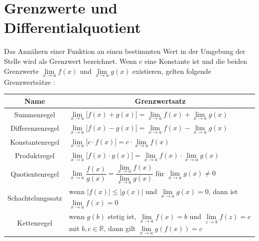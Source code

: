 \documentclass[11pt, a4paper]{report}
\begin{document}
\section{Grenzwerte und Differentialquotient}
Das Annähern einer Funktion an einen bestimmten Wert in der Umgebung der Stelle wird als Grenzwert bezeichnet. Wenn c eine Konstante ist und die beiden Grenzwerte $\lim\limits_{x \to a}{f(x)}$ und $\lim\limits_{x \to a}{g(x)}$ existieren, gelten folgende Grenzwertsätze \cite[Seite 141 ff.]{Stewart.2015}:
\begin{center}
\begin{tabular}[h]{|c|p{9cm}|}
\hline
\multicolumn{1}{|c}{Name} & \multicolumn{1}{|c|}{Grenzwertsatz}\\ \hline %
	Summenregel & $\lim\limits_{x \to a}{\lbrack f(x)+g(x)\rbrack} = \lim\limits_{x \to a}{f(x)}+\lim\limits_{x \to a}{g(x)}$\\ \hline
	Differenzenregel & $\lim\limits_{x \to a}{\lbrack f(x)-g(x)\rbrack} = \lim\limits_{x \to a}{f(x)}-\lim\limits_{x \to a}{g(x)}$\\ \hline
	Konstantenregel & $\lim\limits_{x \to a}{\lbrack c \cdot f(x) \rbrack} = c \cdot \lim\limits_{x \to a}{f(x)}$\\ \hline
	Produktregel & $\lim\limits_{x \to a}{\lbrack f(x) \cdot g(x)\rbrack} = \lim\limits_{x \to a}{f(x)} \cdot \lim\limits_{x \to a}{g(x)}$\\ \hline
	Quotientenregel & $\lim\limits_{x \to a}{\dfrac{f(x)}{g(x)}} = \dfrac{\lim\limits_{x \to a}{f(x)}}{\lim\limits_{x \to a}{g(x)}}$ für $\lim\limits_{x \to a}{g(x)}\neq 0$\\ \hline
	Schachtelungssatz & wenn $|f(x)|\le |g(x)|$ und $\lim\limits_{x \to a}{g(x)} = 0$, dann ist $\lim\limits_{x \to a}{f(x)} = 0$\\ \hline
	Kettenregel & wenn $g(b)$ stetig ist, $\lim\limits_{x \to a}{f(x)} = b$ und $\lim\limits_{z \to b}{f(z)} = c$ mit $b,c \in \mathbb{R}$, dann gilt $\lim\limits_{x \to a}{g(f(x))} = c$ \\ \hline
\end{tabular}
\label{tab:Grenzwertsätze}
\end{center}
\end{document}

